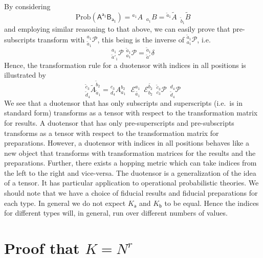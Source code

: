 \documentclass[10pt]{article}
\begin{document}
By considering
\begin{equation}
\text{Prob}(\mathsf{A^{a_1} B_{a_1}}) = {}^{a_1}\!A \,\,\, {}_{a_1}\!B = {}^{\tilde{a}_1}\!\!\tilde{A}\,\,\, {}_{\tilde{b}_1}\!\!\tilde{B}
\end{equation}
and employing similar reasoning to that above, we can easily prove that pre-subscripts transform with  ${}^{a_1}_{\tilde{a}_1} \mathcal{P}$, this being is the inverse of ${}_{a_1}^{\tilde{a}_1} \mathcal{P}$, i.e.\
\begin{equation}
{}^{a_1}_{\tilde{a}'_1} \mathcal{P}\,\, {}_{a_1}^{\tilde{a}_1}\! \mathcal{P} = {}^{\tilde{a}_1}_{\tilde{a}'} \delta
\end{equation}
Hence, the transformation rule for a duotensor with indices in all positions is illustrated by
\begin{equation}\label{duotensortrans}
{}^{\tilde{c}_3}_{\tilde{d}_4}\!\tilde{A}_{\tilde{a}_1}^{\tilde{b}_2} =      {}^{c_3}_{d_4}\!A_{a_1}^{b_2} \,\,\,\,  \mathcal{E}^{a_1}_{\tilde{a_1}}\,\, \, \mathcal{E}_{b_2}^{\tilde{b_2}}   \,\,\, {}_{c_3}^{\tilde{c}_3} \mathcal{P} \,\,\,{}^{d_4}_{\tilde{d}_4} \mathcal{P}
\end{equation}
We see that a duotensor that has only subscripts and superscripts (i.e.\ is in standard form) transforms as a tensor with respect to the transformation matrix for results.  A duotensor that has only pre-superscripts and pre-subscripts transforms as a tensor with respect to the transformation matrix for preparations.  However, a duotensor with indices in all positions behaves like a new object that transforms with transformation matrices for the results and the preparations.  Further, there exists a hopping metric which can take indices from the left to the right and vice-versa.  The duotensor is a generalization of the idea of a tensor.  It has particular application to operational probabilistic theories. We should note that we have a choice of fiducial results and fiducial preparations for each type.  In general we do not expect $K_{\mathsf a}$ and $K_{\mathsf b}$ to be equal.  Hence the indices for different types will, in general, run over different numbers of values.


\section{Proof that $K=N^r$}\label{AppendixC}
\end{document}
